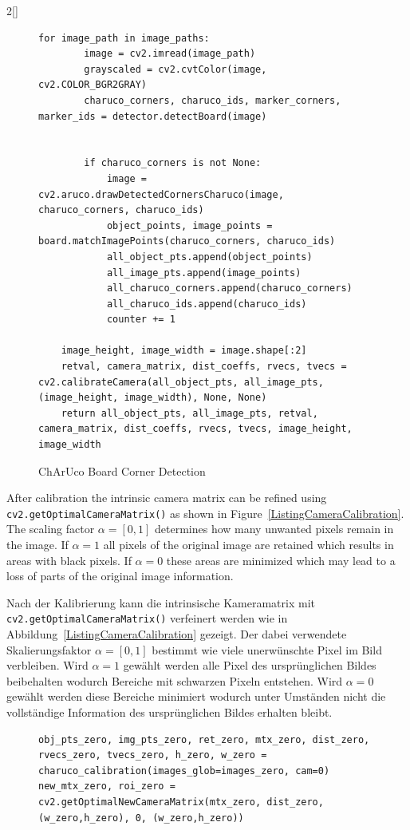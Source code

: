 \begin{paracol}{2}[]
\begin{figure}
\begin{lstlisting}[style=shell]
	for image_path in image_paths:
		image = cv2.imread(image_path)
		grayscaled = cv2.cvtColor(image, cv2.COLOR_BGR2GRAY)
		charuco_corners, charuco_ids, marker_corners, marker_ids = detector.detectBoard(image)


		if charuco_corners is not None:   
			image = cv2.aruco.drawDetectedCornersCharuco(image, charuco_corners, charuco_ids)
			object_points, image_points = board.matchImagePoints(charuco_corners, charuco_ids)
			all_object_pts.append(object_points)
			all_image_pts.append(image_points)
			all_charuco_corners.append(charuco_corners)
			all_charuco_ids.append(charuco_ids)
			counter += 1

	image_height, image_width = image.shape[:2]
	retval, camera_matrix, dist_coeffs, rvecs, tvecs = cv2.calibrateCamera(all_object_pts, all_image_pts, (image_height, image_width), None, None)
	return all_object_pts, all_image_pts, retval, camera_matrix, dist_coeffs, rvecs, tvecs, image_height, image_width
	\end{lstlisting}
	\caption{ChArUco Board Corner Detection}
	\label{ListingCornerDetection}
\end{figure}
\FloatBarrier

\colstart

After calibration the intrinsic camera matrix can be refined using \texttt{cv2.getOptimalCameraMatrix()} as shown in Figure~\ref{ListingCameraCalibration}. The scaling factor $\alpha = [0, 1]$ determines how many unwanted pixels remain in the image. If $\alpha = 1$ all pixels of the original image are retained which results in areas with black pixels. If $\alpha = 0$ these areas are minimized which may lead to a loss of parts of the original image information.

\colger

Nach der Kalibrierung kann die intrinsische Kameramatrix mit \texttt{cv2.getOptimalCameraMatrix()} verfeinert werden wie in Abbildung~\ref{ListingCameraCalibration} gezeigt. Der dabei verwendete Skalierungsfaktor $\alpha = [0, 1]$ bestimmt wie viele unerwünschte Pixel im Bild verbleiben. Wird $\alpha = 1$ gewählt werden alle Pixel des ursprünglichen Bildes beibehalten wodurch Bereiche mit schwarzen Pixeln entstehen. Wird $\alpha = 0$ gewählt werden diese Bereiche minimiert wodurch unter Umständen nicht die vollständige Information des ursprünglichen Bildes erhalten bleibt.

\colende

\begin{figure}
	\begin{lstlisting}[style=shell]
obj_pts_zero, img_pts_zero, ret_zero, mtx_zero, dist_zero, rvecs_zero, tvecs_zero, h_zero, w_zero = charuco_calibration(images_glob=images_zero, cam=0)
new_mtx_zero, roi_zero = cv2.getOptimalNewCameraMatrix(mtx_zero, dist_zero, (w_zero,h_zero), 0, (w_zero,h_zero))


\end{lstlisting}
\end{figure}
\end{paracol}
